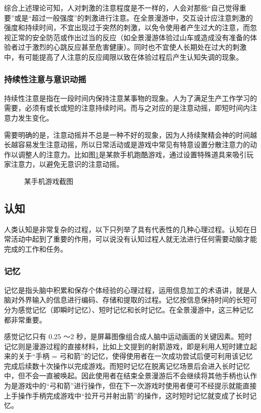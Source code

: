 综合上述理论可知，人对刺激的注意程度是不一样的，人会对那些“自己觉得重要”或是“超过一般强度”的刺激进行注意。在全景漫游中，交互设计应注意刺激的强度和持续时间，不宜出现过于突然的刺激，以免令使用者产生过大的注意，而忽视正常的安全防范或作出过当的反应（如全景漫游体验过山车或造成没有准备的体验者过于激烈的心跳反应甚至危害健康）。同时也不宜使人长期处在过大的刺激中，有可能提高了人注意的反应阈限以致在体验过程后产生认知失调的现象。

\subsubsection{持续性注意与意识动摇}
持续性注意是指在一段时间内保持注意某事物的现象。人为了满足生产工作学习的需要，必须有或长或短的注意持续时间。而与之对应的是注意动摇，即短时间内注意力发生变化。

需要明确的是，注意动摇并不总是一种不好的现象，因为人持续聚精会神的时间越长越容易发生注意动摇，所以日常活动或是游戏中常见有特意设置分散注意力的动作以调整人的注意力。比如图\ref{fig:magnet}是某款手机跑酷游戏，通过设置特殊道具来吸引玩家注意力，以避免无意识的注意动摇。

\begin{figure}[htp]
\centering
{}
\caption{某手机游戏截图}
\label{fig:magnet}
\end{figure}

\subsection{认知}
人类认知是非常复杂的过程，以下只列举了具有代表性的几种心理过程。认知在日常活动中起到了重要的作用，可以说没有认知过程人就无法进行任何需要动脑才能完成的工作和任务。

\subsubsection{记忆}
记忆是指头脑中积累和保存个体经验的心理过程，运用信息加工的术语讲，就是人脑对外界输入的信息进行编码、存储和提取的过程。记忆按信息保持时间的长短可分为感觉记忆（即瞬时记忆）、短时记忆和长时记忆。在全景漫游中，这三种记忆都非常重要。

感觉记忆只有 0.25
～2 秒，是屏幕图像组合成人脑中运动画面的关键因素。短时记忆则是漫游过程的直接材料，比如上文提到的射箭游戏，即是利用人短时建立起来的关于“手柄 = 弓和箭”的记忆，使得使用者在一次成功尝试后便可利用该记忆完成后续数十次操作以完成游戏。而短时记忆在脱离记忆场景后会进入长时记忆中，但不会一直被唤起。因此使用者在结束全景漫游后不会继续将其他手柄也认作为是游戏中的“弓和箭”进行操作，但在下一次游戏时使用者便可不经提示就能直接上手操作手柄完成游戏中“拉开弓并射出箭”的操作，这时短时记忆就变成了长时记忆。

